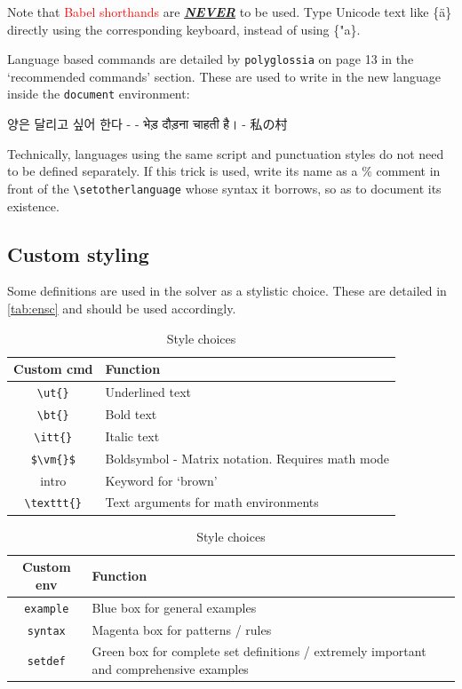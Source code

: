 \documentclass[12pt,twoside]{article}
\newcommand*{\bt}[1]{\textbf{#1}}
\newcommand*{\ut}[1]{\uline{#1}}
\newcommand*{\itt}[1]{\textit{#1}}
\newcommand*{\vm}[1]{\boldsymbol{#1}}
\newenvironment{example}{\def\FrameCommand{\colorbox{sampler}} \MakeFramed{\advance\hsize+\width}\begin{center}}{\end{center}\endMakeFramed}
\begin{document}
Note that \textcolor{red}{Babel shorthands} are \ut{\bt{\textit{NEVER}}} to be used. Type Unicode text like \{ä\} directly using the corresponding keyboard, instead of using \{"a\}. 

Language based commands are detailed by \texttt{polyglossia} on page 13 in the `recommended commands' section. These are used to write in the new language inside the \texttt{document} environment:
\begin{example}
\textkorean{양은 달리고 싶어 한다} -  - \textsanskrit{भेड़ दौड़ना चाहती है।} - \textjapanese{私の村}
\end{example}
Technically, languages using the same script and punctuation styles do not need to be defined separately. If this trick is used, write its name as a \% comment in front of the \verb|\setotherlanguage| whose syntax it borrows, so as to document its existence.

\subsection{Custom styling}
Some definitions are used in the solver as a stylistic choice. These are detailed in \autoref{tab:ensc} and should be used accordingly.
\begin{table}[bth]
\centering
\begin{subtable}{\textwidth}
\centering
\begin{tabular}{|c|m{8cm}|}
	\hline \bt{Custom cmd} & \bt{Function}\\\hline
	\verb|\ut{}| & Underlined text\\\hline
	\verb|\bt{}| & Bold text\\\hline \verb|\itt{}| & Italic text\\\hline
	\verb|$\vm{}$| & Boldsymbol - Matrix notation. Requires math mode\\\hline
	intro & Keyword for `brown'\\\hline
    \verb|\texttt{}| & Text arguments for math environments\\\hline
\end{tabular}
\end{subtable}
\begin{subtable}{\textwidth}
\centering
\begin{tabular}{|c|m{8cm}|}
\hline \bt{Custom env} & \bt{Function}\\\hline
	\texttt{example} & Blue box for general examples\\\hline
	\texttt{syntax} & Magenta box for patterns / rules\\\hline
	\texttt{setdef} & Green box for complete set definitions / extremely important and comprehensive examples\\\hline
\end{tabular}
\end{subtable}
\caption{Style choices}
\label{tab:ensc}
\end{table}
\end{document}
